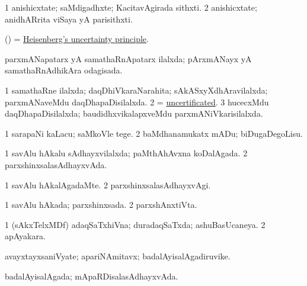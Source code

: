 \bentry
{} 
\gl{\nA}
\bmng
\bnum
\num{1} anishicxtate; saMdigadhxte; KacitavAgirada sithxti. 
\num{2} anishicxtate; anidhARrita viSaya yA parisithxti. 
\enum
\emng
\eentry

\bentry
{}
\gl{\nA}
\expl{}
\bmng
(\Bwvi) = \hyperref{kandict_h.pdf}{H}{Heisenberg's uncertainty principle}{Heisenberg's uncertainty principle}. 
\emng
\eentry

\bentry
{} 
\gl{\gu}
\expl{}
\bmng
parxmANapatarx yA samathaRnApatarx ilalxda; pArxmANayx yA samathaRnAdhikAra odagisada. 
\emng
\eentry

\bentry
{} 
\gl{\gu}
\expl{}
\bmng
\bnum
\num{1} samathaRne ilalxda; daqDhiVkaraNarahita; sAkASxyXdhAravilalxda; parxmANaveMdu daqDhapaDisilalxda. 
\num{2} = \hyperlink{uncertificated}{uncertificated}. 
\num{3} hucecxMdu daqDhapaDisilalxda; baudidhxvikalapxveMdu parxmANiVkarisilalxda. 
\enum
\emng
\eentry

\bentry
{} 
\gl{\sakirx}
\expl{}
\bmng
\bnum
\num{1} sarapaNi kaLacu; saMkoVle tege. 
\num{2} baMdhanamukatx mADu; biDugaDegoLisu. 
\enum
\emng
\eentry

\bentry
{} 
\gl{\gu}
\expl{}
\bmng
\bnum
\num{1} savAlu hAkalu sAdhayxvilalxda; paMthAhAvxna koDalAgada. 
\num{2} parxshinxsalasAdhayxvAda. 
\enum
\emng
\eentry

\bentry
{} 
\gl{\kirxvi}
\expl{}
\bmng
\bnum
\num{1} savAlu hAkalAgadaMte. 
\num{2} parxshinxsalasAdhayxvAgi. 
\enum
\emng
\eentry

\bentry
{} 
\gl{\gu}
\expl{}
\bmng
\bnum
\num{1} savAlu hAkada; parxshinxsada. 
\num{2} parxshAnxtiVta. 
\enum
\emng
\eentry

\bentry
{} 
\gl{\gu}
\bmng
\bnum
\num{1} (sAkxTelxMDf) adaqSaTxhiVna; duradaqSaTxda; ashuBasUcaneya. 
\num{2} apAyakara. 
\enum
\emng
\eentry

\bentry
{} 
\gl{\nA}
\expl{}
\bmng
avayxtayxsaniVyate; apariNAmitavx; badalAyisalAgadiruvike. 
\emng
\eentry

\bentry
{} 
\gl{\gu}
\expl{}
\bmng
badalAyisalAgada; mApaRDisalasAdhayxvAda. 
\emng
\eentry

